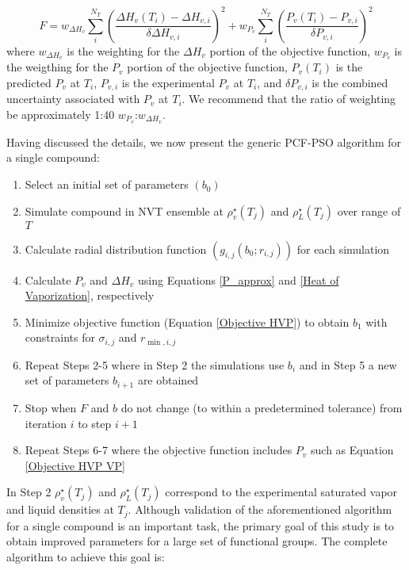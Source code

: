 \documentclass[12pt]{article}
\begin{document}
\begin{equation} \label{Objective HVP VP}
F = w_{\Delta H_v} \sum_{i}^{N_T} \left(\frac{\Delta H_v(T_i) - \Delta H_{v,i}}{\delta \Delta H_{v,i}}\right)^2 + w_{P_v} \sum_{i}^{N_T} \left(\frac{P_v(T_i) - P_{v,i}}{\delta P_{v,i}}\right)^2
\end{equation}
where $w_{\Delta H_v}$ is the weighting for the $\Delta H_v$ portion of the objective function, $w_{P_v}$ is the weigthing for the $P_v$ portion of the objective function, $P_v(T_i)$ is the predicted $P_v$ at $T_i$, $P_{v,i}$ is the experimental $P_v$ at $T_i$, and $\delta P_{v,i}$ is the combined uncertainty associated with $P_v$ at $T_i$. We recommend that the ratio of weighting be approximately 1:40 $w_{P_v}$:$w_{\Delta H_v}$. 

Having discussed the details, we now present the generic PCF-PSO algorithm for a single compound:

\begin{enumerate}
\item Select an initial set of parameters $(b_0)$
\item Simulate compound in NVT ensemble at $\rho_v^{\star}(T_j)$ and $\rho_L^{\star}(T_j)$ over range of $T$
\item Calculate radial distribution function $(g_{i,j}(b_0;r_{i,j}))$ for each simulation
\item Calculate $P_v$ and $\Delta H_v$ using Equations \ref{P_approx} and \ref{Heat of Vaporization}, respectively
\item Minimize objective function (Equation \ref{Objective HVP}) to obtain $b_1$ with constraints for $\sigma_{i,j}$ and $r_{\min,i,j}$
\item Repeat Steps 2-5 where in Step 2 the simulations use $b_i$ and in Step 5 a new set of parameters $b_{i+1}$ are obtained
\item Stop when $F$ and $b$ do not change (to within a predetermined tolerance) from iteration $i$ to step $i+1$  
\item Repeat Steps 6-7 where the objective function includes $P_v$ such as Equation \ref{Objective HVP VP}
\end{enumerate}

In Step 2 $\rho_v^{\star}(T_j)$ and $\rho_L^{\star}(T_j)$ correspond to the experimental saturated vapor and liquid densities at $T_j$. Although validation of the aforementioned algorithm for a single compound is an important task, the primary goal of this study is to obtain improved parameters for a large set of functional groups. The complete algorithm to achieve this goal is:
\end{document}
